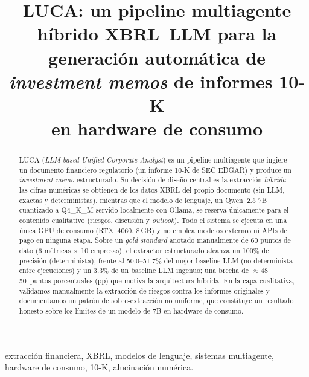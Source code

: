\documentclass[conference]{IEEEtran}
\begin{document}
\title{LUCA: un pipeline multiagente híbrido XBRL--LLM para la\\
generación automática de \textit{investment memos} de informes 10-K\\
en hardware de consumo}

\author{
}

\maketitle

\begin{abstract}
LUCA (\textit{LLM-based Unified Corporate Analyst}) es un pipeline multiagente que ingiere un documento financiero regulatorio
(un informe 10-K de SEC EDGAR) y produce un \textit{investment memo}
estructurado. Su decisión de diseño central es la extracción \emph{híbrida}: las
cifras numéricas se obtienen de los datos XBRL del propio documento (sin LLM,
exactas y deterministas), mientras que el modelo de lenguaje, un Qwen~2.5 7B
cuantizado a Q4\_K\_M servido localmente con Ollama, se reserva únicamente para
el contenido cualitativo (riesgos, discusión y \textit{outlook}). Todo el
sistema se ejecuta en una única GPU de consumo (RTX~4060, 8\,GB) y no emplea
modelos externos ni APIs de pago en ninguna etapa. Sobre un \textit{gold
standard} anotado manualmente de 60 puntos de dato (6 métricas $\times$ 10
empresas), el extractor estructurado alcanza un 100\% de precisión
(determinista), frente al 50.0--51.7\% del mejor baseline LLM (no determinista
entre ejecuciones) y un 3.3\% de un baseline LLM ingenuo; una brecha de
$\approx$48--50~puntos porcentuales (pp) que motiva la arquitectura híbrida. En
la capa cualitativa, validamos manualmente la extracción de riesgos contra los
informes originales y documentamos un patrón de sobre-extracción no uniforme,
que constituye un resultado honesto sobre los límites de un modelo de 7B en
hardware de consumo.
\end{abstract}

\begin{IEEEkeywords}
extracción financiera, XBRL, modelos de lenguaje, sistemas multiagente,
hardware de consumo, 10-K, alucinación numérica.
\end{IEEEkeywords}
\end{document}
